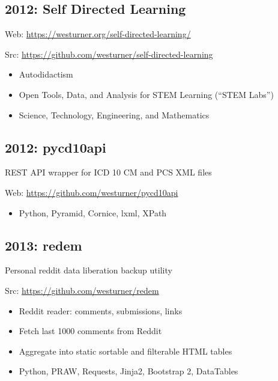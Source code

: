 \documentclass[letter,,openany,oneside]{sphinxhowto}
\begin{document}
\subsection{2012: Self Directed Learning}
\label{resume:self-directed-learning}
\begin{DUlineblock}{0em}
\item[] Web: \url{https://westurner.org/self-directed-learning/}
\item[] Src: \url{https://github.com/westurner/self-directed-learning}
\end{DUlineblock}
\begin{itemize}
\item {} 
Autodidactism

\item {} 
Open Tools, Data, and Analysis for STEM Learning (``STEM Labs'')

\item {} 
Science, Technology, Engineering, and Mathematics

\end{itemize}


\subsection{2012: pycd10api}
\label{resume:pycd10api}
\begin{DUlineblock}{0em}
\item[] REST API wrapper for ICD 10 CM and PCS XML files
\item[] Web: \url{https://github.com/westurner/pycd10api}
\end{DUlineblock}
\begin{itemize}
\item {} 
Python, Pyramid, Cornice, lxml, XPath

\end{itemize}


\subsection{2013: redem}
\label{resume:redem}
\begin{DUlineblock}{0em}
\item[] Personal reddit data liberation backup utility
\item[] Src: \url{https://github.com/westurner/redem}
\end{DUlineblock}
\begin{itemize}
\item {} 
Reddit reader: comments, submissions, links

\item {} 
Fetch last 1000 comments from Reddit

\item {} 
Aggregate into static sortable and filterable HTML tables

\item {} 
Python, PRAW, Requests, Jinja2, Bootstrap 2, DataTables

\end{itemize}
\end{document}
